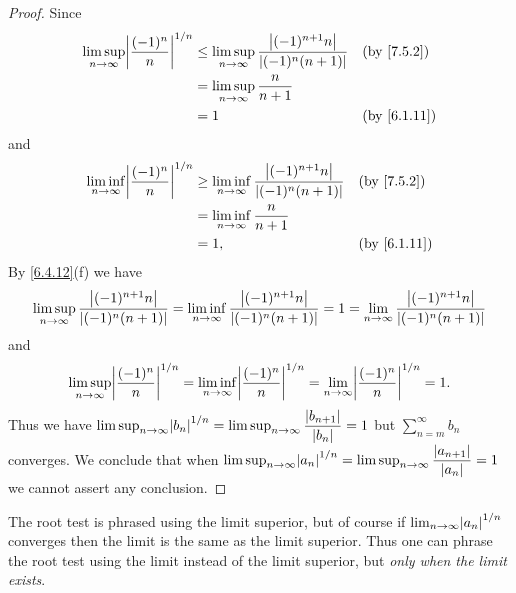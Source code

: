 \begin{proof}
  Since
  \begin{align*}
    \limsup_{n \to \infty} \abs{\dfrac{(-1)^n}{n}}^{1 / n} & \leq \limsup_{n \to \infty} \dfrac{\abs{(-1)^{n + 1} n}}{\abs{(-1)^n (n + 1)}} &  & \text{(by \cref{7.5.2})}  \\
                                                           & = \limsup_{n \to \infty} \dfrac{n}{n + 1}                                                                     \\
                                                           & = 1                                                                            &  & \text{(by \cref{6.1.11})}
  \end{align*}
  and
  \begin{align*}
    \liminf_{n \to \infty} \abs{\dfrac{(-1)^n}{n}}^{1 / n} & \geq \liminf_{n \to \infty} \dfrac{\abs{(-1)^{n + 1} n}}{\abs{(-1)^n (n + 1)}} &  & \text{(by \cref{7.5.2})}  \\
                                                           & = \liminf_{n \to \infty} \dfrac{n}{n + 1}                                                                     \\
                                                           & = 1,                                                                           &  & \text{(by \cref{6.1.11})}
  \end{align*}
  By \cref{6.4.12}(f) we have
  \[
    \limsup_{n \to \infty} \dfrac{\left\lvert(-1)^{n + 1} n\right\rvert}{\left\lvert(-1)^n (n + 1)\right\rvert} = \liminf_{n \to \infty} \dfrac{\left\lvert(-1)^{n + 1} n\right\rvert}{\left\lvert(-1)^n (n + 1)\right\rvert} = 1 = \lim_{n \to \infty} \dfrac{\left\lvert(-1)^{n + 1} n\right\rvert}{\left\lvert(-1)^n (n + 1)\right\rvert}
  \]
  and
  \[
    \limsup_{n \to \infty} \abs{\dfrac{(-1)^n}{n}}^{1 / n} = \liminf_{n \to \infty} \abs{\dfrac{(-1)^n}{n}}^{1 / n} = \lim_{n \to \infty} \abs{\dfrac{(-1)^n}{n}}^{1 / n} = 1.
  \]
  Thus we have \(\limsup_{n \to \infty} \abs{b_n}^{1 / n} = \limsup_{n \to \infty} \dfrac{\abs{b_{n + 1}}}{\abs{b_n}} = 1\) but \(\sum_{n = m}^\infty b_n\) converges.
  We conclude that when \(\limsup_{n \to \infty} \abs{a_n}^{1 / n} = \limsup_{n \to \infty} \dfrac{\abs{a_{n + 1}}}{\abs{a_n}} = 1\) we cannot assert any conclusion.
\end{proof}

\begin{note}
  The root test is phrased using the limit superior, but of course if \(\lim_{n \to \infty} \abs{a_n}^{1 / n}\) converges then the limit is the same as the limit superior.
  Thus one can phrase the root test using the limit instead of the limit superior, but \emph{only when the limit exists}.
\end{note}

